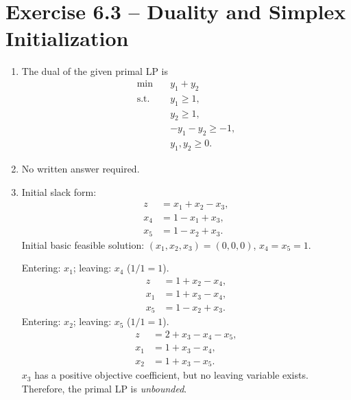 \documentclass{Group_Templ}
\begin{document}
	
	\section*{Exercise 6.3 -- Duality and Simplex Initialization}
	\begin{enumerate}
		\item The dual of the given primal LP is
		\begin{align*}
			\min\quad &y_1+y_2\\
			\text{s.t.}\quad &y_1\ge 1,\\
			&y_2\ge 1,\\
			&-y_1-y_2\ge -1,\\
			&y_1,y_2\ge 0.
		\end{align*}
		
		\item No written answer required.
		
		\item Initial slack form:
		\begin{align*}
			z&=x_1+x_2-x_3,\\
			x_4&=1-x_1+x_3,\\
			x_5&=1-x_2+x_3.
		\end{align*}
		Initial basic feasible solution: $(x_1,x_2,x_3)=(0,0,0)$, $x_4=x_5=1$.
		
		Entering: $x_1$; leaving: $x_4$ ($1/1=1$).
		\begin{align*}
			z&=1+x_2-x_4,\\
			x_1&=1+x_3-x_4,\\
			x_5&=1-x_2+x_3.
		\end{align*}
		Entering: $x_2$; leaving: $x_5$ ($1/1=1$).
		\begin{align*}
			z&=2+x_3-x_4-x_5,\\
			x_1&=1+x_3-x_4,\\
			x_2&=1+x_3-x_5.
		\end{align*}
		$x_3$ has a positive objective coefficient, but no leaving variable exists.
		Therefore, the primal LP is \emph{unbounded}.
		

\end{enumerate}
\end{document}
